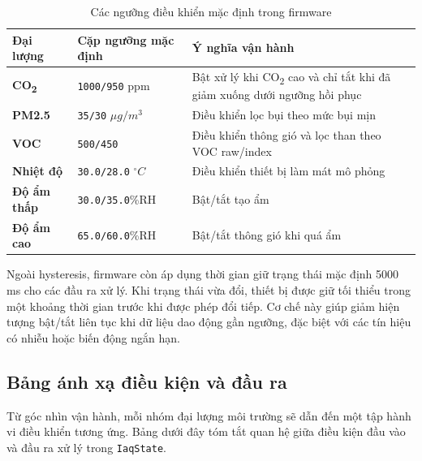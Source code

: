 \begin{table}[H]
    \centering
    \caption{Các ngưỡng điều khiển mặc định trong firmware}
    \begin{tabularx}{\textwidth}{>{\bfseries}l l X}
        \toprule
        Đại lượng & Cặp ngưỡng mặc định & Ý nghĩa vận hành \\
        \midrule
        CO\textsubscript{2} & \texttt{1000/950} ppm & Bật xử lý khi CO\textsubscript{2} cao và chỉ tắt khi đã giảm xuống dưới ngưỡng hồi phục \\
        PM2.5 & \texttt{35/30} \(\mu g/m^3\) & Điều khiển lọc bụi theo mức bụi mịn \\
        VOC & \texttt{500/450} & Điều khiển thông gió và lọc than theo VOC raw/index \\
        Nhiệt độ & \texttt{30.0/28.0} \(^{\circ}C\) & Điều khiển thiết bị làm mát mô phỏng \\
        Độ ẩm thấp & \texttt{30.0/35.0}\%RH & Bật/tắt tạo ẩm \\
        Độ ẩm cao & \texttt{65.0/60.0}\%RH & Bật/tắt thông gió khi quá ẩm \\
        \bottomrule
    \end{tabularx}
\end{table}

Ngoài hysteresis, firmware còn áp dụng thời gian giữ trạng thái mặc định 5000 ms cho các đầu ra xử lý.
Khi trạng thái vừa đổi, thiết bị được giữ tối thiểu trong một khoảng thời gian trước khi
được phép đổi tiếp. Cơ chế này giúp giảm hiện tượng bật/tắt liên tục khi dữ liệu dao
động gần ngưỡng, đặc biệt với các tín hiệu có nhiễu hoặc biến động ngắn hạn.

\subsection{Bảng ánh xạ điều kiện và đầu ra}

Từ góc nhìn vận hành, mỗi nhóm đại lượng môi trường sẽ dẫn đến một tập hành vi điều
khiển tương ứng. Bảng dưới đây tóm tắt quan hệ giữa điều kiện đầu vào và
đầu ra xử lý trong \texttt{IaqState}.

